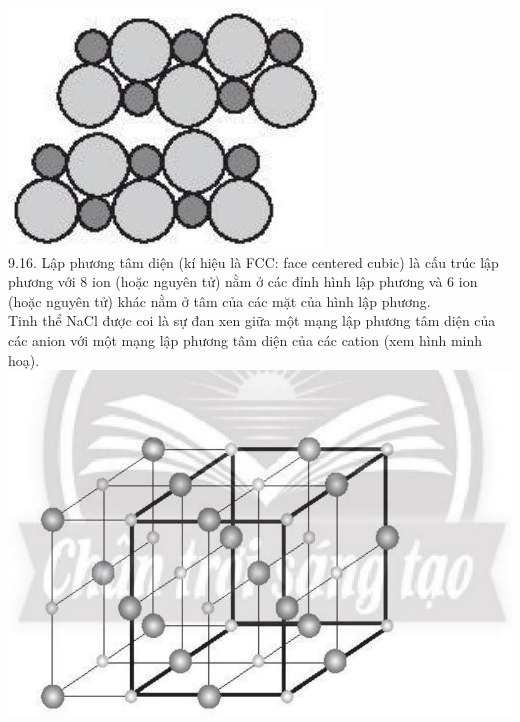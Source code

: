 \documentclass[10pt]{article}
\begin{document}
\includegraphics[max width=\textwidth, center]{2025_10_23_57761e23b8c46a11c3efg-23(1)}\\
9.16. Lập phương tâm diện (kí hiệu là FCC: face centered cubic) là cấu trúc lập phương với 8 ion (hoặc nguyên tử) nằm ở các đỉnh hình lập phương và 6 ion (hoặc nguyên tử) khác nằm ở tâm của các mặt của hình lập phương.\\
Tinh thể NaCl được coi là sự đan xen giữa một mạng lập phương tâm diện của các anion với một mạng lập phương tâm diện của các cation (xem hình minh hoạ).\\
\includegraphics[max width=\textwidth, center]{2025_10_23_57761e23b8c46a11c3efg-23}
\end{document}

